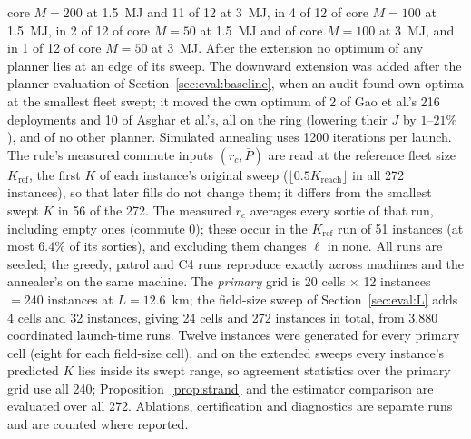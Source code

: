 \documentclass[journal,outdir=./]{IEEEtran}
\newcommand{\Kr}{K_{\mathrm{reach}}}
\newcommand{\rc}{r_{c}}
\newcommand{\Pbar}{\bar{P}}
\begin{document}
core $M=200$ at 1.5~MJ and 11 of 12 at 3~MJ, in 4 of 12 of core $M=100$ at 1.5~MJ, in 2 of 12 of core $M=50$ at 1.5~MJ and of core $M=100$ at 3~MJ, and in 1 of 12 of core $M=50$ at 3~MJ. After the extension no optimum of any planner lies at an edge of its sweep. The downward extension was added after the planner evaluation of Section~\ref{sec:eval:baseline}, when an audit found own optima at the smallest fleet swept; it moved the own optimum of 2 of Gao et al.'s 216 deployments and 10 of Asghar et al.'s, all on the ring (lowering their $J$ by $1$--$21\%$), and of no other planner. Simulated annealing uses 1200 iterations per launch. The rule's measured commute inputs $(\rc,\Pbar)$ are read at the reference fleet size $K_{\mathrm{ref}}$, the first $K$ of each instance's original sweep ($\lfloor0.5\Kr\rfloor$ in all 272 instances), so that later fills do not change them; it differs from the smallest swept $K$ in 56 of the 272. The measured $\rc$ averages every sortie of that run, including empty ones (commute 0); these occur in the $K_{\mathrm{ref}}$ run of 51 instances (at most $6.4\%$ of its sorties), and excluding them changes $\ell$ in none. All runs are seeded; the greedy, patrol and C4 runs reproduce exactly across machines and the annealer's on the same machine. The \emph{primary} grid is 20 cells $\times$ 12 instances $=240$ instances at $L=12.6$~km; the field-size sweep of Section~\ref{sec:eval:L} adds 4 cells and 32 instances, giving 24 cells and 272 instances in total, from 3{,}880 coordinated launch-time runs. Twelve instances were generated for every primary cell (eight for each field-size cell), and on the extended sweeps every instance's predicted $K$ lies inside its swept range, so agreement statistics over the primary grid use all 240; Proposition~\ref{prop:strand} and the estimator comparison are evaluated over all 272. Ablations, certification and diagnostics are separate runs and are counted where reported.
\end{document}
